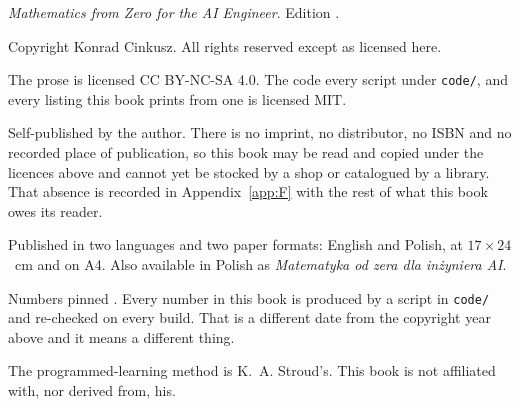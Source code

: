 
\thispagestyle{empty}
\vspace*{\fill}

{\small\color{mgrey}\raggedright\setlength{\parindent}{0pt}%
\emph{Mathematics from Zero for the AI Engineer}. Edition \bookedition.

\medskip
Copyright \textcopyright{} \bookyear{} Konrad Cinkusz. All rights reserved
except as licensed here.

\medskip
The prose is licensed CC BY-NC-SA 4.0. The code \dash{} every script under
\texttt{code/}, and every listing this book prints from one \dash{} is
licensed MIT.

\medskip
Self-published by the author. There is no imprint, no distributor, no ISBN
and no recorded place of publication, so this book may be read and copied
under the licences above and cannot yet be stocked by a shop or catalogued by
a library. That absence is recorded in Appendix~\ref{app:F} with the rest of
what this book owes its reader.

\medskip
Published in two languages and two paper formats: English and Polish, at
$17 \times 24$~cm and on A4. Also available in Polish as
\emph{Matematyka od zera dla inżyniera AI}.

\medskip
Numbers pinned \pinnedon. Every number in this book is produced by a script
in \texttt{code/} and re-checked on every build. That is a different date from
the copyright year above and it means a different thing.

\medskip
The programmed-learning method is K.~A. Stroud's. This book is not affiliated
with, nor derived from, his.
\par}

\cleardoublepage
